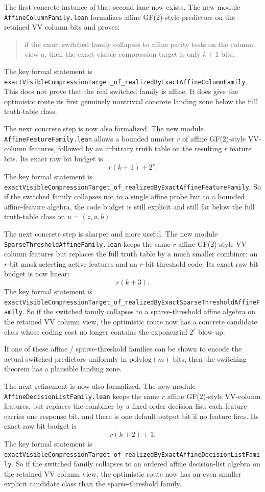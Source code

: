 \documentclass[11pt]{article}
\theoremstyle{remark}
\begin{document}
The first concrete instance of that second lane now exists.  The new module
\texttt{AffineColumnFamily.lean} formalizes affine GF(2)-style predictors on the
retained VV column bits and proves:
\begin{quote}
if the exact switched family collapses to affine parity tests on the column
view \(a\), then the exact visible compression target is only \(k+1\) bits.
\end{quote}

\noindent
The key formal statement is
\texttt{exactVisibleCompressionTarget\_of\_realizedByExactAffineColumnFamily}.
This does not prove that the real switched family is affine.  It does give the
optimistic route its first genuinely nontrivial concrete landing zone below the
full truth-table class.

The next concrete step is now also formalized.  The new module
\texttt{AffineFeatureFamily.lean} allows a bounded number \(r\) of affine
GF(2)-style VV-column features, followed by an arbitrary truth table on the
resulting \(r\) feature bits.  Its exact raw bit budget is
\[
  r(k+1) + 2^r.
\]
The key formal statement is
\texttt{exactVisibleCompressionTarget\_of\_realizedByExactAffineFeatureFamily}.
So if the switched family collapses not to a single affine probe but to a
bounded affine-feature algebra, the code budget is still explicit and still far
below the full truth-table class on \(u=(z,a,b)\).

The next concrete step is sharper and more useful.  The new module
\texttt{SparseThresholdAffineFamily.lean} keeps the same \(r\) affine
GF(2)-style VV-column features but replaces the full truth table by a much
smaller combiner: an \(r\)-bit mask selecting active features and an \(r\)-bit
threshold code.  Its exact raw bit budget is now linear:
\[
  r(k+3).
\]
The key formal statement is
\texttt{exactVisibleCompressionTarget\_of\_realizedByExactSparseThresholdAffineFamily}.
So if the switched family collapses to a sparse-threshold affine algebra on the
retained VV column view, the optimistic route now has a concrete candidate
class whose coding cost no longer contains the exponential \(2^r\) blow-up.

If one of these affine / sparse-threshold families can be shown to encode the
actual switched predictors uniformly in \(\mathrm{polylog}(m)\) bits, then the
switching theorem has a plausible landing zone.

The next refinement is now also formalized.  The new module
\texttt{AffineDecisionListFamily.lean} keeps the same \(r\) affine GF(2)-style
VV-column features, but replaces the combiner by a fixed-order decision list:
each feature carries one response bit, and there is one default output bit if
no feature fires.  Its exact raw bit budget is
\[
  r(k+2) + 1.
\]
The key formal statement is
\texttt{exactVisibleCompressionTarget\_of\_realizedByExactAffineDecisionListFamily}.
So if the switched family collapses to an ordered affine decision-list algebra
on the retained VV column view, the optimistic route now has an even smaller
explicit candidate class than the sparse-threshold family.
\end{document}
